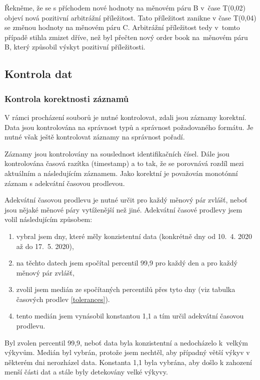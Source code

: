 \documentclass[thesis=B,czech]{FITthesis}[2019/03/21]
\begin{document}
Řekněme, že se s příchodem nové hodnoty na měnovém páru B v~čase T(0,02) objeví nová pozitivní arbitrážní příležitost. Tato příležitost zanikne v čase T(0,04) se změnou hodnoty na měnovém páru C. Arbitrážní příležitost tedy v~tomto případě stihla zmizet dříve, než byl přečten nový order book na~měnovém páru B, který způsobil výskyt pozitivní příležitosti. 
\subsection{Kontrola dat}
\subsubsection{Kontrola korektnosti záznamů}
\label{section:kontrola_korektnosti_zaznamu}
V rámci procházení souborů je nutné kontrolovat, zdali jsou záznamy korektní. Data jsou kontrolována na správnost typů a správnost požadovaného formátu. Je nutné však ještě kontrolovat záznamy na správnost pořadí.

Záznamy jsou kontrolovány na souslednost identifikačních čísel. Dále jsou kontrolována časová razítka (timestamp) a to tak, že se porovnává rozdíl mezi aktuálním a následujícím záznamem. Jako korektní je považován monotónní záznam s adekvátní časovou prodlevou. 

Adekvátní časovou prodlevu je nutné určit pro každý měnový pár zvlášť, neboť jsou nějaké měnové páry vytíženější než jiné. Adekvátní časové prodlevy jsem volil následujícím způsobem:

\begin{enumerate}
    \item vybral jsem dny, které měly konzistentní data (konkrétně dny od 10.~4. 2020 až do 17.~5. 2020),
    \item na těchto datech jsem spočítal percentil 99,9 pro každý den a pro každý měnový pár zvlášť,
    \item zvolil jsem medián ze spočítaných percentilů přes tyto dny (viz tabulka časových prodlev \ref{tolerances}).
    \item tento medián jsem vynásobil konstantou 1,1 a tím určil adekvátní časovou prodlevu.
\end{enumerate}

Byl zvolen percentil 99,9, neboť data byla konzistentní a nedocházelo k~velkým výkyvům. Medián byl vybrán, protože jsem nechtěl, aby případný větší výkyv v některém dni nerozházel data. Konstanta 1,1 byla vybrána, aby došlo k zahození menší části dat a stále byly detekovány velké výkyvy.
\end{document}
